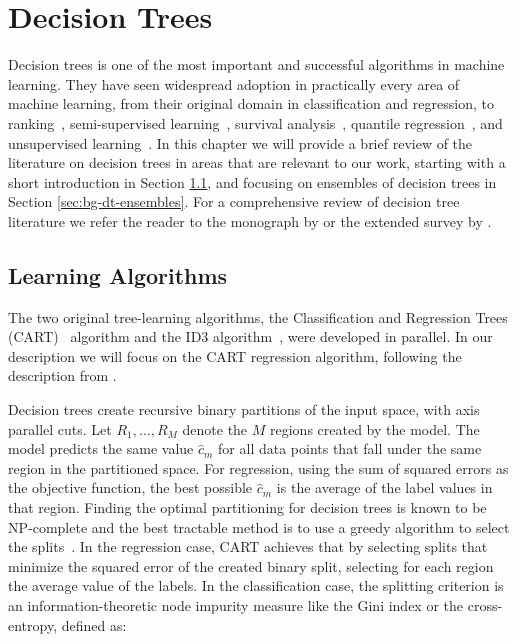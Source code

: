 \chapter{Decision Trees}
\label{ch:bg-decision-trees}

Decision trees is one of the most important and successful algorithms
in machine learning. They have seen widespread adoption in practically
every area of machine learning, from their original domain in classification
and regression, to ranking~\cite{lambdarank}, semi-supervised learning~\cite{semi-super-trees}, survival analysis~\cite{survival-forests},
quantile regression~\cite{meinshausen2006quantile}, and unsupervised learning~\cite{tree-clustering}. In this chapter
we will provide a brief review of the literature on decision trees in
areas that are relevant to our work, starting with a short introduction
in Section \ref{sec:bg-dt-learning-algorithms}, and focusing on ensembles of decision
trees in Section \ref{sec:bg-dt-ensembles}. For a comprehensive review of
decision tree literature we refer the reader to the monograph
by \citet{decision-trees-book} or the extended survey by \citet{tree-survey}.

\section{Learning Algorithms}
\label{sec:bg-dt-learning-algorithms}

The two original tree-learning algorithms, the
Classification and Regression Trees (CART)~\cite{breiman1984cart} algorithm and the ID3
algorithm~\cite{id3}, were developed in parallel. In our description we will
focus on the CART regression algorithm, following the description from \cite{esl}.

Decision trees create recursive binary partitions of the input space,
with axis parallel cuts. Let $R_1, ..., R_M$ denote the $M$ regions created by
the model.
The model predicts the same value $\hat{c}_m$ for all data points
that fall under the same region in the partitioned space. For regression,
using the sum of squared errors as the objective function, the best possible
$\hat{c}_m$ is the average of the label values in that region.
Finding the optimal partitioning for decision trees is known to be
NP-complete \cite{dt-np-complete} and the best tractable method
is to use a greedy algorithm to select the splits~\cite{dt-hardness}.
In the regression case, CART achieves that by selecting splits
that minimize the squared error of the created binary split, selecting
for each region the average value of the labels.
In the classification case, the splitting criterion is an information-theoretic
node impurity measure like the Gini index or the cross-entropy, defined as:

